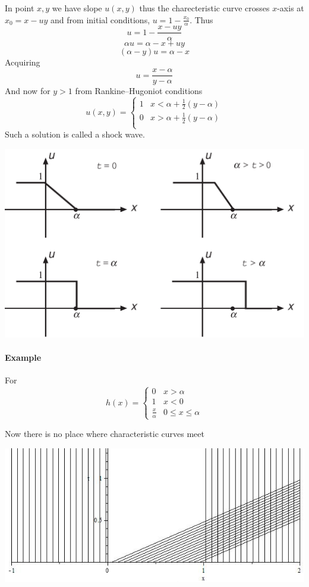 In point $x,y$ we have slope $u(x,y)$ thus the charecteristic curve crosses $x$-axis at $x_0 = x-uy$ and from initial conditions, $u=1-\frac{x_0}{\alpha}$. Thus
$$u=1-\frac{x-uy}{\alpha}$$
$$\alpha u=\alpha-x+uy$$
$$(\alpha-y) u=\alpha-x$$
Acquiring
$$u = \frac{x-\alpha}{y-\alpha}$$
And now for $y>1$ from Rankine–Hugoniot conditions
$$u(x,y) = \begin{cases}
1 & x<\alpha + \frac{1}{2} (y-\alpha)\\
0 & x>\alpha + \frac{1}{2} (y-\alpha)\\
\end{cases}$$
Such a solution is called a shock wave.

\begin{center}
	\includegraphics[width=0.7\linewidth]{./lect2/p1.png}
\end{center}

\paragraph{Example}
For
$$h(x) = \begin{cases}
0 & x> \alpha\\
1 & x < 0\\
\frac{x}{\alpha} & 0\leq x \leq \alpha
\end{cases}$$

Now there is no place where characteristic curves meet

\begin{center}
	\includegraphics[width=0.7\linewidth]{./lect2/p3.png}
\end{center}

